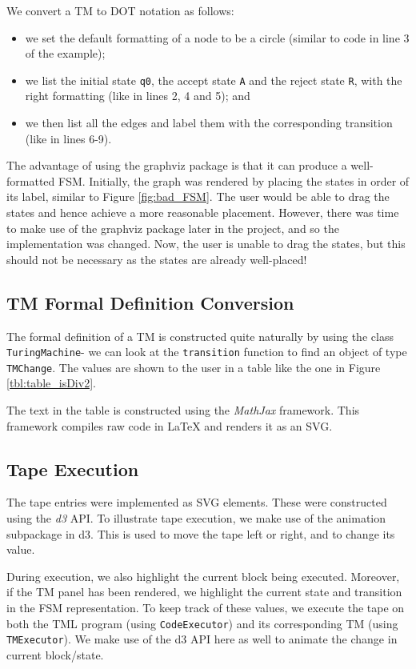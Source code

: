We convert a TM to DOT notation as follows:
\begin{itemize}
    \item we set the default formatting of a node to be a circle (similar to code in line 3 of the example);
    \item we list the initial state \texttt{q0}, the accept state \texttt{A} and the reject state \texttt{R}, with the right formatting (like in lines 2, 4 and 5); and 
    \item we then list all the edges and label them with the corresponding transition (like in lines 6-9).
\end{itemize}

The advantage of using the graphviz package is that it can produce a well-formatted FSM. Initially, the graph was rendered by placing the states in order of its label, similar to Figure \ref{fig:bad_FSM}. The user would be able to drag the states and hence achieve a more reasonable placement. However, there was time to make use of the graphviz package later in the project, and so the implementation was changed. Now, the user is unable to drag the states, but this should not be necessary as the states are already well-placed!

\subsection{TM Formal Definition Conversion}
The formal definition of a TM is constructed quite naturally by using the class \texttt{TuringMachine}- we can look at the \texttt{transition} function to find an object of type \texttt{TMChange}. The values are shown to the user in a table like the one in Figure \ref{tbl:table_isDiv2}.

The text in the table is constructed using the \emph{MathJax} framework. This framework compiles raw code in LaTeX and renders it as an SVG.

\subsection{Tape Execution}

The tape entries were implemented as SVG elements. These were constructed using the \emph{d3} API. To illustrate tape execution, we make use of the animation subpackage in d3. This is used to move the tape left or right, and to change its value. 

During execution, we also highlight the current block being executed. Moreover, if the TM panel has been rendered, we highlight the current state and transition in the FSM representation. To keep track of these values, we execute the tape on both the TML program (using \texttt{CodeExecutor}) and its corresponding TM (using \texttt{TMExecutor}). We make use of the d3 API here as well to animate the change in current block/state.
